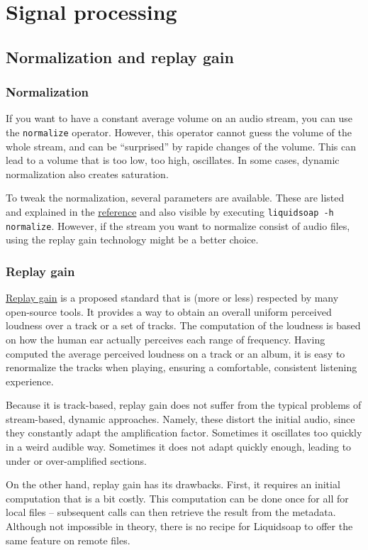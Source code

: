 \documentclass{book}
\begin{document}
\chapter{Signal processing}
\section{Normalization and replay gain}
\subsection{Normalization}
If you want to have a constant average volume on an audio stream, you can use
the \verb+normalize+ operator. However, this operator cannot guess the volume of
the whole stream, and can be ``surprised'' by rapide changes of the volume. This
can lead to a volume that is too low, too high, oscillates. In some cases,
dynamic normalization also creates saturation.

To tweak the normalization, several parameters are available. These are listed
and explained in the \href{reference.html}{reference} and also visible by
executing \verb+liquidsoap -h normalize+. However, if the stream you want to
normalize consist of audio files, using the replay gain technology might be a
better choice.

\subsection{Replay gain}
\href{http://www.replaygain.org}{Replay gain} is a proposed standard that is
(more or less) respected by many open-source tools. It provides a way to obtain
an overall uniform perceived loudness over a track or a set of tracks. The
computation of the loudness is based on how the human ear actually perceives
each range of frequency. Having computed the average perceived loudness on a
track or an album, it is easy to renormalize the tracks when playing, ensuring a
comfortable, consistent listening experience.

Because it is track-based, replay gain does not suffer from the typical problems
of stream-based, dynamic approaches. Namely, these distort the initial audio,
since they constantly adapt the amplification factor. Sometimes it oscillates
too quickly in a weird audible way. Sometimes it does not adapt quickly enough,
leading to under or over-amplified sections.

On the other hand, replay gain has its drawbacks. First, it requires an initial
computation that is a bit costly. This computation can be done once for all for
local files -- subsequent calls can then retrieve the result from the
metadata. Although not impossible in theory, there is no recipe for Liquidsoap
to offer the same feature on remote files.
\end{document}
